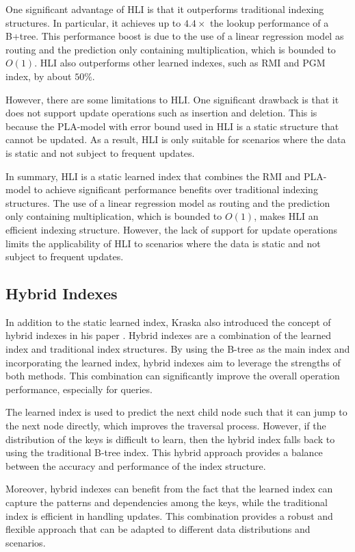 One significant advantage of HLI is that it outperforms traditional indexing structures. In particular, it achieves up to $4.4\times$ the lookup performance of a B+tree. This performance boost is due to the use of a linear regression model as routing and the prediction only containing multiplication, which is bounded to $O(1)$. HLI also outperforms other learned indexes, such as RMI and PGM index, by about $50\%$.

However, there are some limitations to HLI. One significant drawback is that it does not support update operations such as insertion and deletion. This is because the PLA-model with error bound used in HLI is a static structure that cannot be updated. As a result, HLI is only suitable for scenarios where the data is static and not subject to frequent updates.

In summary, HLI is a static learned index that combines the RMI and PLA-model to achieve significant performance benefits over traditional indexing structures. The use of a linear regression model as routing and the prediction only containing multiplication, which is bounded to $O(1)$, makes HLI an efficient indexing structure. However, the lack of support for update operations limits the applicability of HLI to scenarios where the data is static and not subject to frequent updates.


\subsection{Hybrid Indexes}

In addition to the static learned index, Kraska also introduced the concept of hybrid indexes in his paper \cite{CasedLearnedIndex}. Hybrid indexes are a combination of the learned index and traditional index structures. By using the B-tree as the main index and incorporating the learned index, hybrid indexes aim to leverage the strengths of both methods. This combination can significantly improve the overall operation performance, especially for queries.

The learned index is used to predict the next child node such that it can jump to the next node directly, which improves the traversal process. However, if the distribution of the keys is difficult to learn, then the hybrid index falls back to using the traditional B-tree index. This hybrid approach provides a balance between the accuracy and performance of the index structure.

Moreover, hybrid indexes can benefit from the fact that the learned index can capture the patterns and dependencies among the keys, while the traditional index is efficient in handling updates. This combination provides a robust and flexible approach that can be adapted to different data distributions and scenarios.

